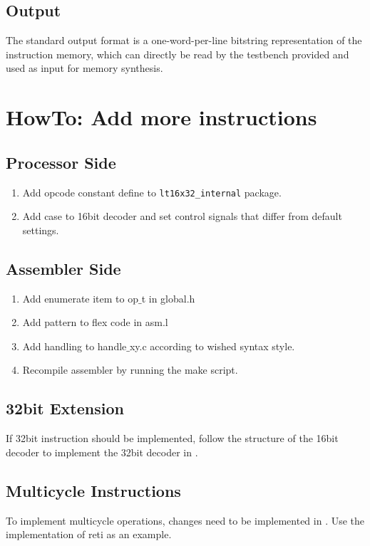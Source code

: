 \subsection{Output}
The standard output format is a one-word-per-line bitstring representation of the instruction memory, which can directly be read by the testbench provided and used as input for memory synthesis.

\section{HowTo: Add more instructions}
\subsection{Processor Side}
\begin{enumerate}
\item Add opcode constant define to \verb=lt16x32_internal= package.
\item Add case to 16bit decoder and set control signals that differ from default settings.
\end{enumerate}
\subsection{Assembler Side}
\begin{enumerate}
\item Add enumerate item to op$\_$t in global.h
\item Add pattern to flex code in asm.l
\item Add handling to handle$\_$xy.c according to wished syntax style.
\item Recompile assembler by running the make script.
\end{enumerate}
\subsection{32bit Extension}
If 32bit instruction should be implemented, follow the structure of the 16bit decoder to implement the 32bit decoder in .

\subsection{Multicycle Instructions}
To implement multicycle operations, changes need to be implemented in .
Use the implementation of reti as an example.

